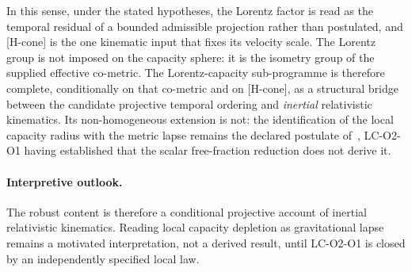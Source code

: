 \documentclass[12pt,a4paper]{article}
\theoremstyle{remark}
\begin{document}
  In this sense, under the stated hypotheses, the Lorentz factor is read as the temporal residual of a bounded
  admissible projection rather than postulated, and [H-cone] is the one kinematic input that fixes its velocity
  scale.
  The Lorentz group is not imposed on the capacity sphere: it is the isometry group of the
  supplied effective co-metric.
  The Lorentz-capacity sub-programme is therefore complete, conditionally on that co-metric and on [H-cone], as a
  structural bridge between the candidate projective temporal ordering and \emph{inertial} relativistic kinematics.
  Its non-homogeneous extension is not: the identification of the local capacity radius with the
  metric lapse remains the declared postulate of~\cite{Beau2026lco2}, LC-O2-O1 having established
  that the scalar free-fraction reduction does not derive it.

  \paragraph{Interpretive outlook.}
  The robust content is therefore a conditional projective account of inertial relativistic kinematics.
  Reading local capacity depletion as gravitational lapse remains a motivated interpretation,
  not a derived result, until LC-O2-O1 is closed by an independently specified local law.

  
  
\end{document}
